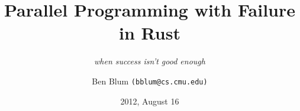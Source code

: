 \documentclass[xcolor=dvipsnames]{beamer}
\title[Linked Task Failure]{{\bf Parallel Programming with Failure in Rust}}
\subtitle[]{ {\em when success isn't good enough}}
\author[Ben Blum]{Ben Blum \texttt{(bblum@cs.cmu.edu)}}
\institute[Mozilla Research]{Mozilla Research}
\date[]{2012, August 16}
\begin{document}
\renewcommand{\inserttotalframenumber}{28}
\normalem
\begin{frame}
	\titlepage
\end{frame}


\newcommand\linegap{\vspace{0.2in}}
\newcommand\breakslide[1]{\begin{frame}{} \begin{center} \Large #1 \end{center} \end{frame}}
\newcommand\related[1]{\textsuperscript{\em [#1]}}
\newcommand\hilight[2]{\color{#1}#2\color{black}}
\end{document}
